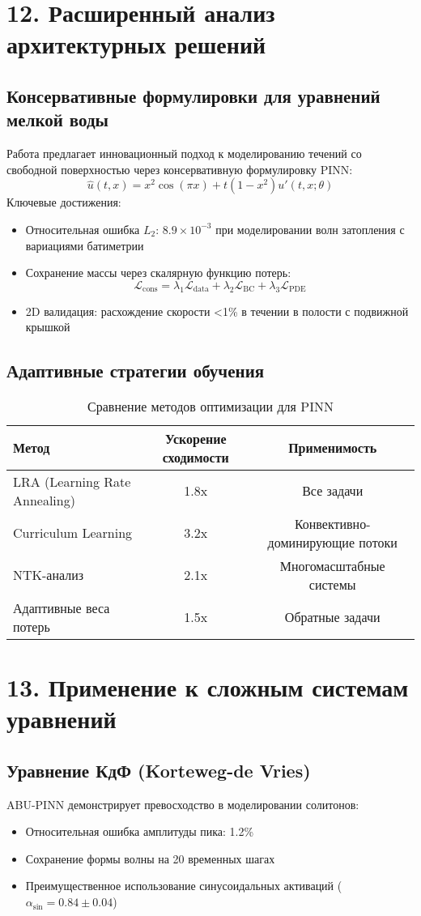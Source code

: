 \section*{12. Расширенный анализ архитектурных решений}
\subsection*{Консервативные формулировки для уравнений мелкой воды}
Работа \cite{free_surface} предлагает инновационный подход к моделированию течений со свободной поверхностью через консервативную формулировку PINN:
\[
\hat{u}(t,x) = x^2 \cos(\pi x) + t(1-x^2)u'(t,x;\theta)
\]
Ключевые достижения:
\begin{itemize}
    \item Относительная ошибка $L_2$: $8.9 \times 10^{-3}$ при моделировании волн затопления с вариациями батиметрии
    \item Сохранение массы через скалярную функцию потерь:
    \[
    \mathcal{L}_{\text{cons}} = \lambda_1\mathcal{L}_{\text{data}} + \lambda_2\mathcal{L}_{\text{BC}} + \lambda_3\mathcal{L}_{\text{PDE}}
    \]
    \item 2D валидация: расхождение скорости <1\% в течении в полости с подвижной крышкой
\end{itemize}

\subsection*{Адаптивные стратегии обучения}
\begin{table}[h]
\centering
\caption{Сравнение методов оптимизации для PINN}
\begin{tabular}{l|c|c}
Метод & Ускорение сходимости & Применимость \\
\hline
LRA (Learning Rate Annealing) & 1.8x & Все задачи \\
Curriculum Learning & 3.2x & Конвективно-доминирующие потоки \\
NTK-анализ & 2.1x & Многомасштабные системы \\
Адаптивные веса потерь & 1.5x & Обратные задачи \\
\end{tabular}
\end{table}

\section*{13. Применение к сложным системам уравнений}
\subsection*{Уравнение КдФ (Korteweg-de Vries)}
ABU-PINN демонстрирует превосходство в моделировании солитонов:
\begin{itemize}
    \item Относительная ошибка амплитуды пика: 1.2\% 
    \item Сохранение формы волны на 20 временных шагах
    \item Преимущественное использование синусоидальных активаций ($\alpha_{\text{sin}} = 0.84\pm0.04$)
\end{itemize}

